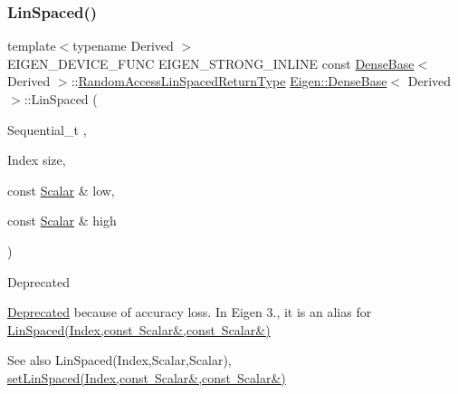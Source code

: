 \subsubsection{\texorpdfstring{LinSpaced()}{LinSpaced()}\hspace{0.1cm}{\footnotesize\ttfamily [1/4]}}
{\footnotesize\ttfamily template$<$typename Derived $>$ \\
E\+I\+G\+E\+N\+\_\+\+D\+E\+V\+I\+C\+E\+\_\+\+F\+U\+NC E\+I\+G\+E\+N\+\_\+\+S\+T\+R\+O\+N\+G\+\_\+\+I\+N\+L\+I\+NE const \mbox{\hyperlink{class_eigen_1_1_dense_base}{Dense\+Base}}$<$ Derived $>$\+::\mbox{\hyperlink{class_eigen_1_1_cwise_nullary_op}{Random\+Access\+Lin\+Spaced\+Return\+Type}} \mbox{\hyperlink{class_eigen_1_1_dense_base}{Eigen\+::\+Dense\+Base}}$<$ Derived $>$\+::Lin\+Spaced (\begin{DoxyParamCaption}\item[{Sequential\+\_\+t}]{,  }\item[{Index}]{size,  }\item[{const \mbox{\hyperlink{class_eigen_1_1_dense_base_a5feed465b3a8e60c47e73ecce83e39a2}{Scalar}} \&}]{low,  }\item[{const \mbox{\hyperlink{class_eigen_1_1_dense_base_a5feed465b3a8e60c47e73ecce83e39a2}{Scalar}} \&}]{high }\end{DoxyParamCaption})\hspace{0.3cm}{\ttfamily [static]}}

\begin{DoxyRefDesc}{Deprecated}
\item[\mbox{\hyperlink{deprecated__deprecated000003}{Deprecated}}]because of accuracy loss. In Eigen 3., it is an alias for \mbox{\hyperlink{class_eigen_1_1_dense_base_a513c7986f48517c36f992a558f81e591}{Lin\+Spaced(\+Index,const Scalar\&,const Scalar\&)}}\end{DoxyRefDesc}


\begin{DoxySeeAlso}{See also}
Lin\+Spaced(\+Index,\+Scalar,\+Scalar), \mbox{\hyperlink{class_eigen_1_1_dense_base_a17a69cfd1b44b64f26b1a0f00666a871}{set\+Lin\+Spaced(\+Index,const Scalar\&,const Scalar\&)}} 
\end{DoxySeeAlso}
\mbox{\label{class_eigen_1_1_dense_base_a513c7986f48517c36f992a558f81e591}} 
